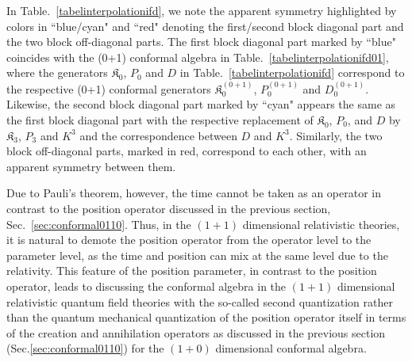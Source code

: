 \documentclass[%
 reprint,
superscriptaddress,
 amsmath,amssymb,
 aps,
]{revtex4-2}
\begin{document}
In Table.~\ref{tabelinterpolationifd}, we note the apparent symmetry highlighted by colors in ``blue/cyan" and ``red" denoting the first/second block diagonal part and the two block off-diagonal parts. The first block diagonal part marked by ``blue" coincides with the (0+1) conformal algebra in Table.~\ref{tabelinterpolationifd01}, where the generators $\mathfrak{K}_{{0}}$, $P_0$ and $D$ in Table.~\ref{tabelinterpolationifd} correspond to the respective (0+1) conformal generators $\mathfrak{K}^{(0+1)}_{{0}}$, $P^{(0+1)}_{0}$ and $D^{(0+1)}_{0}$. Likewise, the second block diagonal part marked by ``cyan" appears the same as the first block diagonal part with the respective replacement of $\mathfrak{K}_{{0}}$, $P_0$, and $D$ by 
$\mathfrak{K}_{{3}}$, $P_3$ and $K^3$ and the correspondence between $D$ and $K^3$. Similarly, the two block off-diagonal parts, marked in red, correspond to each other, with an apparent symmetry between them. 

Due to Pauli's theorem\cite{Galapon1999}, however, the time cannot be taken as an operator in contrast to the position operator discussed in the previous section, Sec.~\ref{sec:conformal0110}. Thus, in the $(1+1)$ dimensional relativistic theories, it is natural to demote the position operator from the operator level to the parameter level, as the time and position can mix at the same level due to the relativity. This feature of the position parameter, in contrast to the position operator, leads to   
discussing the conformal algebra in the $(1+1)$ dimensional relativistic quantum field theories 
with the so-called second quantization
rather than the quantum mechanical quantization of the position operator itself in terms of the creation and annihilation operators as discussed in the previous section (Sec.\ref{sec:conformal0110}) for the $(1+0)$ dimensional conformal algebra.  

\end{document}
